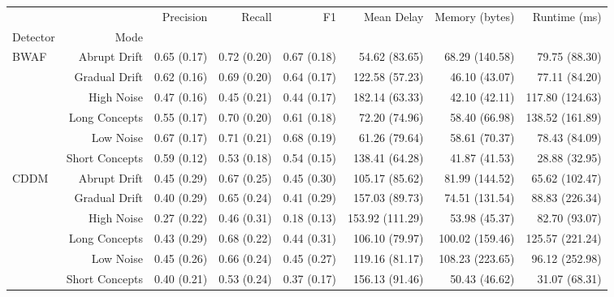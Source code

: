 \begin{tabular}{lrrrrrrr}
\toprule
     &                &    Precision &       Recall &           F1 &       Mean Delay &           Memory (bytes) &          Runtime (ms) \\
Detector & Mode &              &              &              &                  &                  &                  \\
\midrule
BWAF & Abrupt Drift &  0.65 (0.17) &  0.72 (0.20) &  0.67 (0.18) &    54.62 (83.65) &   68.29 (140.58) &    79.75 (88.30) \\
     & Gradual Drift &  0.62 (0.16) &  0.69 (0.20) &  0.64 (0.17) &   122.58 (57.23) &    46.10 (43.07) &    77.11 (84.20) \\
     & High Noise &  0.47 (0.16) &  0.45 (0.21) &  0.44 (0.17) &   182.14 (63.33) &    42.10 (42.11) &  117.80 (124.63) \\
     & Long Concepts &  0.55 (0.17) &  0.70 (0.20) &  0.61 (0.18) &    72.20 (74.96) &    58.40 (66.98) &  138.52 (161.89) \\
     & Low Noise &  0.67 (0.17) &  0.71 (0.21) &  0.68 (0.19) &    61.26 (79.64) &    58.61 (70.37) &    78.43 (84.09) \\
     & Short Concepts &  0.59 (0.12) &  0.53 (0.18) &  0.54 (0.15) &   138.41 (64.28) &    41.87 (41.53) &    28.88 (32.95) \\
CDDM & Abrupt Drift &  0.45 (0.29) &  0.67 (0.25) &  0.45 (0.30) &   105.17 (85.62) &   81.99 (144.52) &   65.62 (102.47) \\
     & Gradual Drift &  0.40 (0.29) &  0.65 (0.24) &  0.41 (0.29) &   157.03 (89.73) &   74.51 (131.54) &   88.83 (226.34) \\
     & High Noise &  0.27 (0.22) &  0.46 (0.31) &  0.18 (0.13) &  153.92 (111.29) &    53.98 (45.37) &    82.70 (93.07) \\
     & Long Concepts &  0.43 (0.29) &  0.68 (0.22) &  0.44 (0.31) &   106.10 (79.97) &  100.02 (159.46) &  125.57 (221.24) \\
     & Low Noise &  0.45 (0.26) &  0.66 (0.24) &  0.45 (0.27) &   119.16 (81.17) &  108.23 (223.65) &   96.12 (252.98) \\
     & Short Concepts &  0.40 (0.21) &  0.53 (0.24) &  0.37 (0.17) &   156.13 (91.46) &    50.43 (46.62) &    31.07 (68.31) \\
\bottomrule
\end{tabular}
